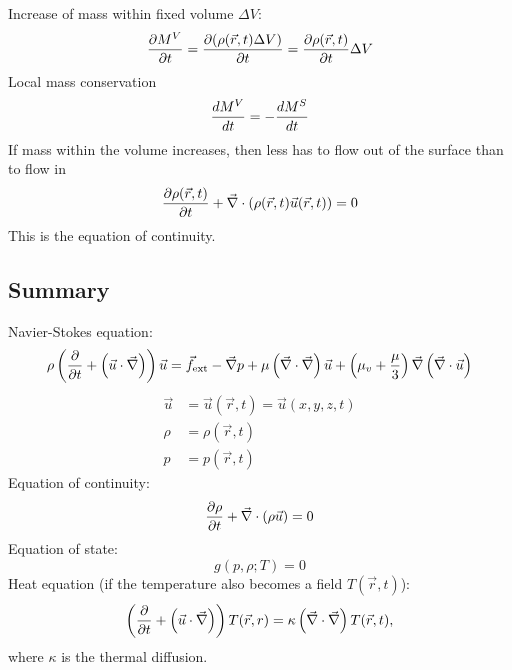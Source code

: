 Increase of mass within fixed volume $\Delta V$:
\begin{equation}
\frac{\partial M^V}{\partial t} = \frac{\partial (\rho(\vec{r},t)\Delta V)}{\partial t} = \frac{\partial \rho(\vec{r},t)}{\partial t}\Delta V
\end{equation}
Local mass conservation
\begin{equation}
\frac{d M^V}{d t} = -\frac{d M^S}{d t}
\end{equation}
If mass within the volume increases, then less has to flow out of the surface than to flow in
\begin{equation}
\frac{\partial \rho(\vec{r},t)}{\partial t}+\vec{\nabla}\cdot\left(\rho(\vec{r},t)\vec{u}(\vec{r},t)\right)=0
\end{equation}
This is the equation of continuity.


\subsection{Summary}
Navier-Stokes equation:
\begin{equation}\label{eq:navier-stokes}
\rho\left(\frac{\partial }{\partial t}+\left(\vec{u}\cdot\vec{\nabla}\right)\right)\vec{u} = \vec{f} _\mathrm{ext}-\vec{\nabla}p+\mu\left(\vec{\nabla}\cdot\vec{\nabla}\right)\vec{u} + \left(\mu_v + \frac{\mu}{3}\right)\vec{\nabla}\left(\vec{\nabla}\cdot\vec{u}\right)
\end{equation}
\begin{align}
\vec{u} &= \vec{u}(\vec{r},t) = \vec{u}(x,y,z,t) \\
\rho &= \rho(\vec{r},t)\\
p &= p(\vec{r},t)
\end{align}
Equation of continuity:
\begin{equation}
\frac{\partial \rho}{\partial t}+\vec{\nabla}\cdot(\rho\vec{u})=0
\end{equation}
Equation of state:
\begin{equation}
g(p,\rho;T)=0
\end{equation}
Heat equation (if the temperature also becomes a field $T(\vec{r},t)$):
\begin{equation}
\left(\frac{\partial }{\partial t}+\left(\vec{u}\cdot\vec{\nabla}\right)\right)T(\vec{r},r) = \kappa\left(\vec{\nabla}\cdot\vec{\nabla}\right)T(\vec{r},t),
\end{equation}
where $\kappa$ is the thermal diffusion.
